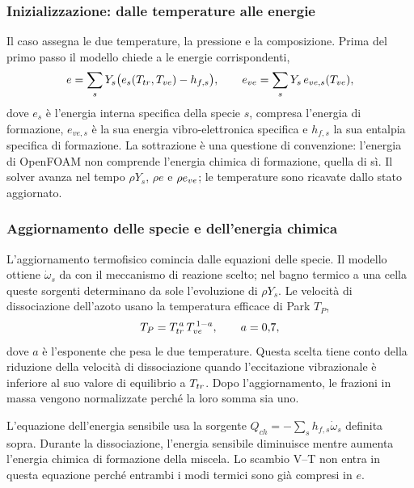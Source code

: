 \subsubsection{Inizializzazione: dalle temperature alle energie}
\label{sec:implementato-avvio}

Il caso assegna le due temperature, la pressione e la composizione. Prima del
primo passo il modello chiede a \mpp{} le energie corrispondenti,
\begin{equation}
  e = \sum_s Y_s\big(e_s(T_{tr},T_{ve}) - h_{f,s}\big),
  \qquad
  e_{ve} = \sum_s Y_s\,e_{ve,s}(T_{ve}) ,
\end{equation}
dove $e_s$ è l'energia interna specifica della specie $s$, compresa l'energia
di formazione, $e_{ve,s}$ è la sua energia vibro-elettronica specifica e
$h_{f,s}$ la sua entalpia specifica di formazione. La sottrazione è una
questione di convenzione: l'energia di
OpenFOAM non comprende l'energia chimica di formazione, quella di \mpp{} sì.
Il solver avanza nel tempo $\rho Y_s$, $\rho e$ e $\rho e_{ve}$; le
temperature sono ricavate dallo stato aggiornato.

\subsubsection{Aggiornamento delle specie e dell'energia chimica}
\label{sec:implementato-specie}
\label{sec:implementato-energia}

L'aggiornamento termofisico comincia dalle equazioni delle specie. Il modello
ottiene $\dot\omega_s$ da \mpp{} con il meccanismo di reazione scelto;
nel bagno termico a una cella queste sorgenti determinano da sole l'evoluzione
di $\rho Y_s$. Le velocità di dissociazione dell'azoto usano la temperatura
efficace di Park $T_P$,
\begin{equation}
  T_P = T_{tr}^{\,a}\,T_{ve}^{\,1-a}, \qquad a = 0{,}7 ,
\end{equation}
dove $a$ è l'esponente che pesa le due temperature. Questa scelta tiene conto
della riduzione della velocità di dissociazione quando
l'eccitazione vibrazionale è inferiore al suo valore di equilibrio a $T_{tr}$.
Dopo l'aggiornamento, le frazioni in massa vengono normalizzate perché la loro
somma sia uno.

L'equazione dell'energia sensibile usa la sorgente
$Q_{ch}=-\sum_s h_{f,s}\dot\omega_s$ definita sopra. Durante la dissociazione,
l'energia sensibile diminuisce mentre aumenta l'energia chimica di formazione
della miscela. Lo scambio V--T non entra in questa equazione perché entrambi
i modi termici sono già compresi in $e$.

